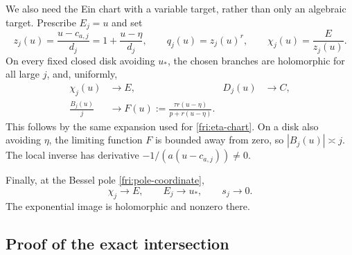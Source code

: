 \documentclass[11pt]{article}
\theoremstyle{definition}
\theoremstyle{remark}
\begin{document}
We also need the Ein chart with a variable target, rather than only
an algebraic target.  Prescribe $E_j=u$ and set
\begin{equation}\label{fre:Ein-chart}
 z_j(u)=\frac{u-c_{a,j}}{d_j}
       =1+\frac{u-\eta}{d_j},\qquad
 q_j(u)=z_j(u)^r,
 \qquad \chi_j(u)=\frac{E}{z_j(u)}.
\end{equation}
On every fixed closed disk avoiding $u_*$, the chosen branches are
holomorphic for all large $j$, and, uniformly,
\begin{align}
 \chi_j(u)&\longrightarrow E,&D_j(u)&\longrightarrow C,
       \label{fre:Ein-limits}\\
 \frac{B_j(u)}j&\longrightarrow
 F(u):=\frac{\tau r(u-\eta)}{p+r(u-\eta)}.
       \label{fre:Ein-beta-growth}
\end{align}
This follows by the same expansion used for
\eqref{fri:eta-chart}.  On a disk also avoiding $\eta$, the limiting
function $F$ is bounded away from zero, so $|B_j(u)|\asymp j$.
The local inverse has derivative
$-1/(a(u-c_{a,j}))\ne0$.

Finally, at the Bessel pole \eqref{fri:pole-coordinate},
\begin{equation}\label{fre:pole-limits}
 \chi_j\longrightarrow E,
 \qquad E_j\longrightarrow u_*,
 \qquad s_j\longrightarrow0.
\end{equation}
The exponential image is holomorphic and nonzero there.

\subsection{Proof of the exact intersection}
\end{document}
